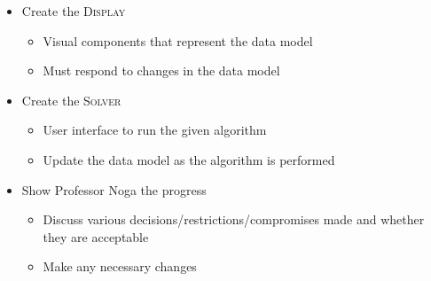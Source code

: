 \begin{itemize}
\begin{itemize}
	\end{itemize}
	\item Create the \textsc{Display}
	\begin{itemize}
		\item Visual components that represent the data model
		\item Must respond to changes in the data model
	\end{itemize}
	\item Create the \textsc{Solver}
	\begin{itemize}
		\item User interface to run the given algorithm
		\item Update the data model as the algorithm is performed
	\end{itemize}
	\item Show Professor Noga the progress
	\begin{itemize}
		\item Discuss various decisions/restrictions/compromises made
			and whether they are acceptable
		\item Make any necessary changes
	\end{itemize}
\end{itemize}